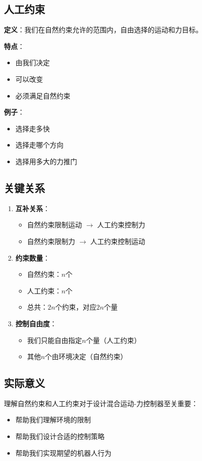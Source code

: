 \documentclass[12pt,a4paper]{article}
\begin{document}
\subsection{人工约束}

\textbf{定义}：我们在自然约束允许的范围内，自由选择的运动和力目标。

\textbf{特点}：
\begin{itemize}
\item 由我们决定
\item 可以改变
\item 必须满足自然约束
\end{itemize}

\textbf{例子}：
\begin{itemize}
\item 选择走多快
\item 选择走哪个方向
\item 选择用多大的力推门
\end{itemize}

\subsection{关键关系}

\begin{enumerate}
\item \textbf{互补关系}：
\begin{itemize}
\item 自然约束限制运动 $\to$ 人工约束控制力
\item 自然约束限制力 $\to$ 人工约束控制运动
\end{itemize}

\item \textbf{约束数量}：
\begin{itemize}
\item 自然约束：$n$个
\item 人工约束：$n$个
\item 总共：$2n$个约束，对应$2n$个量
\end{itemize}

\item \textbf{控制自由度}：
\begin{itemize}
\item 我们只能自由指定$n$个量（人工约束）
\item 其他$n$个由环境决定（自然约束）
\end{itemize}
\end{enumerate}

\subsection{实际意义}

理解自然约束和人工约束对于设计混合运动-力控制器至关重要：
\begin{itemize}
\item 帮助我们理解环境的限制
\item 帮助我们设计合适的控制策略
\item 帮助我们实现期望的机器人行为
\end{itemize}
\end{document}
